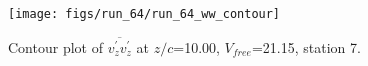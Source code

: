 \begin{figure}[H]
\centering
\texttt{[image: figs/run\_64/run\_64\_ww\_contour]}
\caption{Contour plot of $\overline{v_{z}^{\prime} v_{z}^{\prime}}$ at $z/c$=10.00, $V_{free}$=21.15, station 7.}
\label{fig:run_64_ww_contour}
\end{figure}


